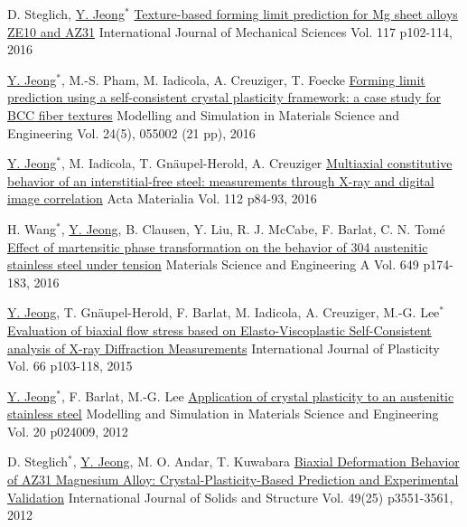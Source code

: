 \begin{cventries}
  \cventry
  {D. Steglich, \underline{Y. Jeong}$^*$}
  {\href{http://dx.doi.org/10.1016/j.ijmecsci.2016.08.013}{Texture-based forming limit prediction for Mg sheet alloys ZE10 and AZ31}}
  {International Journal of Mechanical Sciences} %
  {Vol. 117 p102-114, 2016} %
  {
  }

  \cventry
  {\underline{Y. Jeong}$^*$, M.-S. Pham, M. Iadicola, A. Creuziger, T. Foecke}
  {\href{http://dx.doi.org/10.1088/0965-0393/24/5/055005}{Forming limit prediction using a self-consistent crystal plasticity framework: a case study for BCC fiber textures}}
  {Modelling and Simulation in Materials Science and Engineering}
  {Vol. 24(5), 055002 (21 pp), 2016} %
  {
  }

  \cventry
  {\underline{Y. Jeong}$^*$, M. Iadicola, T. Gn\"{a}upel-Herold, A. Creuziger}
  {\href{http://dx.doi.org/10.1016/j.actamat.2016.04.013}{Multiaxial constitutive behavior of an interstitial-free steel: measurements through X-ray and digital image correlation}}
  {Acta Materialia }
  {Vol. 112 p84-93, 2016}
  {
  }


  \cventry
  {H. Wang$^*$, \underline{Y. Jeong}, B. Clausen, Y. Liu, R. J. McCabe, F. Barlat, C. N. Tom\'{e}}
  {\href{http://dx.doi.org/10.1016/j.msea.2015.09.108}{Effect of martensitic phase transformation on the behavior of 304 austenitic stainless steel under tension}}
  {Materials Science and Engineering A }
  {Vol. 649 p174-183, 2016}
  {
  }

  \cventry
  {\underline{Y. Jeong}, T. Gn\"{a}upel-Herold, F. Barlat, M. Iadicola, A. Creuziger, M.-G. Lee$^*$}
  {\href{http://dx.doi.org/10.1016/j.ijplas.2014.06.009}{Evaluation of biaxial flow stress based on Elasto-Viscoplastic Self-Consistent analysis of X-ray Diffraction Measurements}}
  {International Journal of Plasticity}
  {Vol. 66 p103-118, 2015}
  {
  }

  \cventry
  {\underline{Y. Jeong}$^*$, F. Barlat, M.-G. Lee}
  {\href{http://dx.doi.org/10.1088/0965-0393/20/2/024009}{Application of crystal plasticity to an austenitic stainless steel}}
  {Modelling and Simulation in Materials Science and Engineering}
  {Vol. 20 p024009, 2012}
  {
  }

  \cventry
  {D. Steglich$^*$, \underline{Y. Jeong}, M. O. Andar, T. Kuwabara}
  {\href{http://dx.doi.org/10.1016/j.ijsolstr.2012.06.017}{Biaxial Deformation Behavior of AZ31 Magnesium Alloy: Crystal-Plasticity-Based Prediction and Experimental Validation}}
  {International Journal of Solids and Structure}
  {Vol. 49(25) p3551-3561, 2012}
  {
  }
\item

\end{cventries}



